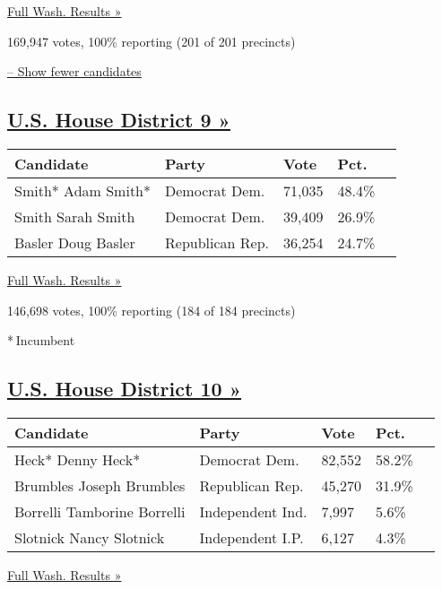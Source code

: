 \href{https://www.nytimes3xbfgragh.onion/elections/results/washington}{Full
Wash. Results »}

169,947 votes, 100\% reporting (201 of 201 precincts)

\protect\hyperlink{}{-- Show fewer candidates}

\hypertarget{us-house-district-9-}{%
\subsection{\texorpdfstring{\href{https://www.nytimes3xbfgragh.onion/elections/results/washington-house-district-9-primary-election}{U.S.
House District 9
»}}{U.S. House District 9 »}}\label{us-house-district-9-}}

\begin{longtable}[]{@{}lllll@{}}
\toprule
Candidate & Party & Vote & Pct. &\tabularnewline
\midrule
\endhead
 Smith* Adam Smith* & Democrat Dem. & 71,035 & 48.4\% &\tabularnewline
 Smith Sarah Smith & Democrat Dem. & 39,409 & 26.9\% &\tabularnewline
 Basler Doug Basler & Republican Rep. & 36,254 & 24.7\% &\tabularnewline
\bottomrule
\end{longtable}

\href{https://www.nytimes3xbfgragh.onion/elections/results/washington}{Full
Wash. Results »}

146,698 votes, 100\% reporting (184 of 184 precincts)

* Incumbent

\hypertarget{us-house-district-10-}{%
\subsection{\texorpdfstring{\href{https://www.nytimes3xbfgragh.onion/elections/results/washington-house-district-10-primary-election}{U.S.
House District 10
»}}{U.S. House District 10 »}}\label{us-house-district-10-}}

\begin{longtable}[]{@{}lllll@{}}
\toprule
Candidate & Party & Vote & Pct. &\tabularnewline
\midrule
\endhead
 Heck* Denny Heck* & Democrat Dem. & 82,552 & 58.2\% &\tabularnewline
 Brumbles Joseph Brumbles & Republican Rep. & 45,270 & 31.9\%
&\tabularnewline
 Borrelli Tamborine Borrelli & Independent Ind. & 7,997 & 5.6\%
&\tabularnewline
 Slotnick Nancy Slotnick & Independent I.P. & 6,127 & 4.3\%
&\tabularnewline
\bottomrule
\end{longtable}

\href{https://www.nytimes3xbfgragh.onion/elections/results/washington}{Full
Wash. Results »}

